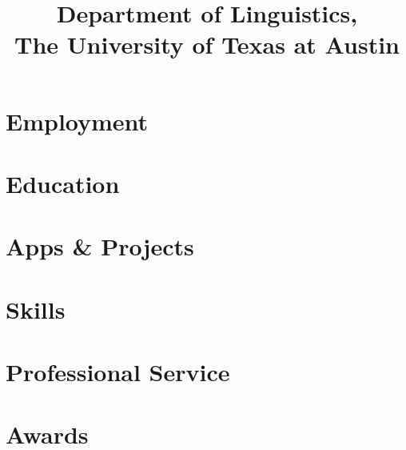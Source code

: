 \documentclass[letterpaper]{practical-resume}
\title{Department of Linguistics,\\The University of Texas at Austin}
\begin{document}
\makecvtitle

\section{Employment}


\section{Education}


\section{Apps \& Projects}


\section{Skills}


\printbibliography[title=Select Publications]

\section{Professional Service}


\section{Awards}

\end{document}
